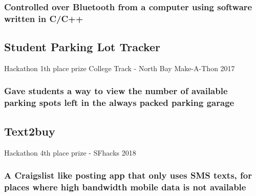 \documentclass{article}
\begin{document}
		\subsubsection{Controlled over Bluetooth from a computer using software written in C/C++}
		
	\subsection{Student Parking Lot Tracker} Hackathon 1th place prize College Track - North Bay Make-A-Thon 2017
    	\vspace{-3mm}
		\subsubsection{Gave students a way to view the number of available parking spots left in the always packed parking garage}
		
	\subsection{Text2buy} Hackathon 4th place prize - SFhacks 2018
    	\vspace{-3mm}
		\subsubsection{A Craigslist  like posting app that only uses SMS texts, for places where high bandwidth mobile data is not available}
		
\end{document}
